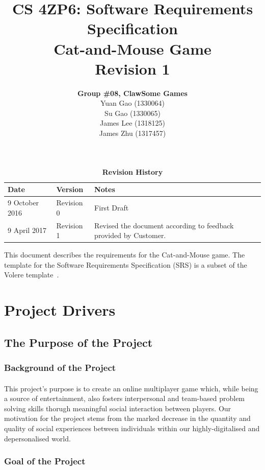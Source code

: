 \documentclass[12pt, titlepage]{article}
\title{CS 4ZP6: Software Requirements Specification
\\Cat-and-Mouse Game
\\Revision 1}
\author{\textbf{Group \#08, ClawSome Games}
		\\ Yuan Gao (1330064)
		\\ Su Gao (1330065)
		\\ James Lee (1318125)
		\\ James Zhu (1317457) 
}
\date{\displaydate{date}}
\begin{document}
\maketitle
{}
\tableofcontents
\listoftables
\listoffigures
\newcommand{\printBusinessEvent}{
    \stepcounter{BusinessEventList}
    \arabic{BusinessEventList}.
}

\begin{table}[hp]
\caption{\bf Revision History}
\begin{tabularx}{\textwidth}{p{3cm}p{2cm}X}
\toprule {\bf Date} & {\bf Version} & {\bf Notes}\\
\midrule
9 October 2016 & Revision 0 & First Draft\\
9 April 2017 & Revision 1 & Revised the document according to feedback provided by Customer.\\
\bottomrule
\end{tabularx}
\end{table}
\newpage
{}
This document describes the requirements for the Cat-and-Mouse game. The template for the Software
Requirements Specification (SRS) is a subset of the Volere
template~\citep{RobertsonAndRobertson2012}. 
\section{Project Drivers}
\subsection{The Purpose of the Project}
\subsubsection{Background of the Project}
\paragraph{}This project's purpose is to create an online multiplayer game which, while being a source of entertainment, also fosters interpersonal and team-based problem solving skills thorugh meaningful social interaction between players. Our motivation for the project stems from the marked decrease in the quantity and quality of social experiences between individuals within our highly-digitalised and depersonalised world.
\subsubsection{Goal of the Project}
\end{document}
